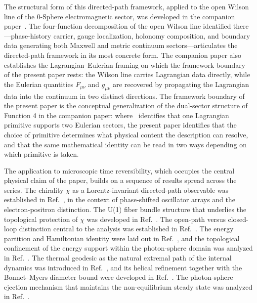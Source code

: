 \documentclass[%
 reprint, amsmath,amssymb, aps, prb, ]{revtex4-2}
\numberwithin{equation}{section}
\begin{document}
The structural form of this directed-path framework, applied to the open Wilson line of the 0-Sphere electromagnetic sector, was developed in the companion paper~\cite{hanamura55}. The four-function decomposition of the open Wilson line identified there---phase-history carrier, gauge localization, holonomy composition, and boundary data generating both Maxwell and metric continuum sectors---articulates the directed-path framework in its most concrete form. The companion paper also establishes the Lagrangian--Eulerian framing on which the framework boundary of the present paper rests: the Wilson line carries Lagrangian data directly, while the Eulerian quantities $F_{\mu\nu}$ and $g_{\mu\nu}$ are recovered by propagating the Lagrangian data into the continuum in two distinct directions. The framework boundary of the present paper is the conceptual generalization of the dual-sector structure of Function 4 in the companion paper: where~\cite{hanamura55} identifies that one Lagrangian primitive supports two Eulerian sectors, the present paper identifies that the choice of primitive determines what physical content the description can resolve, and that the same mathematical identity can be read in two ways depending on which primitive is taken.

The application to microscopic time reversibility, which occupies the central physical claim of the paper, builds on a sequence of results spread across the series. The chirality $\chi$ as a Lorentz-invariant directed-path observable was established in Ref.~\cite{hanamura50}, in the context of phase-shifted oscillator arrays and the electron-positron distinction. The U(1) fiber bundle structure that underlies the topological protection of $\chi$ was developed in Ref.~\cite{hanamura48}. The open-path versus closed-loop distinction central to the analysis was established in Ref.~\cite{hanamura45}. The energy partition and Hamiltonian identity were laid out in Ref.~\cite{hanamura01}, and the topological confinement of the energy support within the photon-sphere domain was analyzed in Ref.~\cite{hanamura33}. The thermal geodesic as the natural extremal path of the internal dynamics was introduced in Ref.~\cite{hanamura24}, and its helical refinement together with the Bonnet--Myers diameter bound were developed in Ref.~\cite{hanamura51}. The photon-sphere ejection mechanism that maintains the non-equilibrium steady state was analyzed in Ref.~\cite{hanamura49}.
\end{document}
